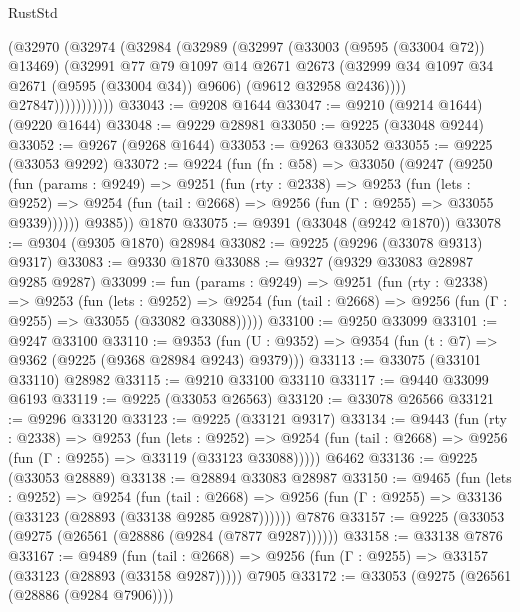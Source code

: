 \begin{lexlean}{RustStd}
\begin{coremodule}
                    (@32970
                      (@32974
                        (@32984
                          (@32989
                            (@32997
                              (@33003 (@9595 (@33004 @72)) @13469)
                              (@32991
                                @77
                                @79
                                @1097
                                @14
                                @2671
                                @2673
                                (@32999 @34 @1097 @34 @2671 (@9595 (@33004 @34)) @9606)
                                (@9612 @32958 @2436))))
                          @27847)))))))))))
@33043 := @9208 @1644
@33047 := @9210 (@9214 @1644) (@9220 @1644)
@33048 := @9229 @28981
@33050 := @9225 (@33048 @9244)
@33052 := @9267 (@9268 @1644)
@33053 := @9263 @33052
@33055 := @9225 (@33053 @9292)
@33072 := @9224
    (fun (fn : @58) =>
    @33050
      (@9247
        (@9250
          (fun (params : @9249) =>
          @9251
            (fun (rty : @2338) =>
            @9253
              (fun (lets : @9252) =>
              @9254 (fun (tail : @2668) => @9256 (fun (Γ : @9255) => @33055 @9339))))))
        @9385))
    @1870
@33075 := @9391 (@33048 (@9242 @1870))
@33078 := @9304 (@9305 @1870) @28984
@33082 := @9225 (@9296 (@33078 @9313) @9317)
@33083 := @9330 @1870
@33088 := @9327 (@9329 @33083 @28987 @9285 @9287)
@33099 := fun (params : @9249) =>
  @9251
    (fun (rty : @2338) =>
    @9253
      (fun (lets : @9252) =>
      @9254 (fun (tail : @2668) => @9256 (fun (Γ : @9255) => @33055 (@33082 @33088)))))
@33100 := @9250 @33099
@33101 := @9247 @33100
@33110 := @9353
    (fun (U : @9352) => @9354 (fun (t : @7) => @9362 (@9225 (@9368 @28984 @9243) @9379)))
@33113 := @33075 (@33101 @33110) @28982
@33115 := @9210 @33100 @33110
@33117 := @9440 @33099 @6193
@33119 := @9225 (@33053 @26563)
@33120 := @33078 @26566
@33121 := @9296 @33120
@33123 := @9225 (@33121 @9317)
@33134 := @9443
    (fun (rty : @2338) =>
    @9253
      (fun (lets : @9252) =>
      @9254 (fun (tail : @2668) => @9256 (fun (Γ : @9255) => @33119 (@33123 @33088)))))
    @6462
@33136 := @9225 (@33053 @28889)
@33138 := @28894 @33083 @28987
@33150 := @9465
    (fun (lets : @9252) =>
    @9254
      (fun (tail : @2668) =>
      @9256 (fun (Γ : @9255) => @33136 (@33123 (@28893 (@33138 @9285 @9287))))))
    @7876
@33157 := @9225 (@33053 (@9275 (@26561 (@28886 (@9284 (@7877 @9287))))))
@33158 := @33138 @7876
@33167 := @9489
    (fun (tail : @2668) => @9256 (fun (Γ : @9255) => @33157 (@33123 (@28893 (@33158 @9287)))))
    @7905
@33172 := @33053 (@9275 (@26561 (@28886 (@9284 @7906))))

\end{coremodule}
\end{lexlean}
